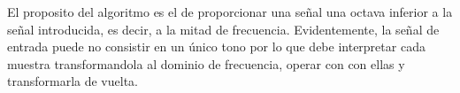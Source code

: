 El proposito del algoritmo es el de proporcionar una señal una octava inferior a la señal introducida, es decir, a la mitad de frecuencia. Evidentemente, la señal de entrada puede no consistir en un único tono por lo que debe interpretar cada muestra transformandola al dominio de frecuencia, operar con con ellas y transformarla de vuelta.